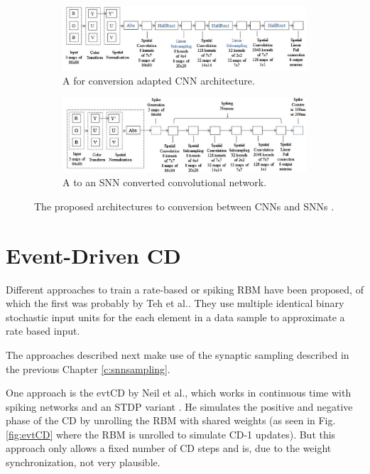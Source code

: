 \begin{figure}
	\centering
	\begin{subfigure}[t]{.80\textwidth}
  		\centering
  		\includegraphics[width=.97\linewidth]{imgs/cnn_snn_conv1.jpg}
  		\caption{A for conversion adapted CNN architecture.}
  		\label{fig:sub1}
	\end{subfigure}%
	
	\begin{subfigure}[t]{.80\textwidth}
  		\centering
  		\includegraphics[width=.97\linewidth]{imgs/cnn_snn_conv2.jpg}
  		\caption{A to an SNN converted convolutional network.}
  		\label{fig:sub2}
	\end{subfigure}
	\caption{The proposed architectures to conversion between CNNs and SNNs \cite{Cao2014}. }
	\label{fig:csnnconv}
\end{figure}

\section{Event-Driven CD} \label{c:ecd}

Different approaches to train a rate-based or spiking RBM have been proposed, of which the first was probably by Teh et al.\cite{Teh2005}.
They use multiple identical binary stochastic input units for the each element in a data sample to approximate a rate based input.

The approaches described next make use of the synaptic sampling described in the previous Chapter \ref{c:snnsampling}.

One approach is the evtCD by Neil et al., which works in continuous time with spiking networks and an STDP variant \cite{Diehl2015}.
He simulates the positive and negative phase of the CD by unrolling the RBM with shared weights (as seen in Fig. \ref{fig:evtCD} where the RBM is unrolled to simulate CD-1 updates). 
But this approach only allows a fixed number of CD steps and is, due to the weight synchronization, not very plausible.

